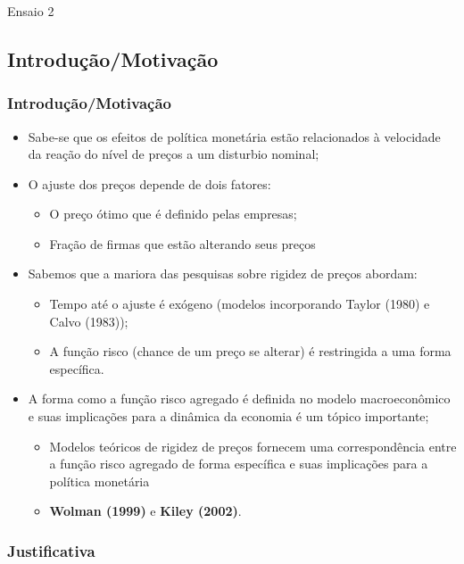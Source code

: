 \documentclass[aspectratio=169]{beamer}
\begin{document}
\begin{frame}\frametitle{}
  \begin{center}
	{\Huge Ensaio 2}
	\end{center}
\end{frame}

\subsection{Introdução/Motivação}

\begin{frame}\frametitle{Introdução/Motivação}
  \begin{itemize}
  \item Sabe-se que os efeitos de política monetária estão relacionados à velocidade da reação do nível de preços a um disturbio nominal;
  \item O ajuste dos preços depende de dois fatores:
    \begin{itemize}
    \item O preço ótimo que é definido pelas empresas;
    \item Fração de firmas que estão alterando seus preços
    \end{itemize}
  \item Sabemos que a mariora das pesquisas sobre rigidez de preços abordam:
    \begin{itemize}
    \item Tempo até o ajuste é exógeno (modelos incorporando Taylor (1980) e Calvo (1983));
    \item A função risco (chance de um preço se alterar) é restringida a uma forma específica.
    \end{itemize}
  \item A forma como a função risco agregado é definida no modelo macroeconômico e suas implicações para a dinâmica da economia é um tópico importante;
    \begin{itemize}
    \item Modelos teóricos de rigidez de preços fornecem uma correspondência entre a função risco agregado de forma específica e suas implicações para a política monetária
    \item \textbf{Wolman (1999)} e \textbf{Kiley (2002)}.
    \end{itemize}
  \end{itemize}
\end{frame}

\subsubsection{Justificativa}
\end{document}
